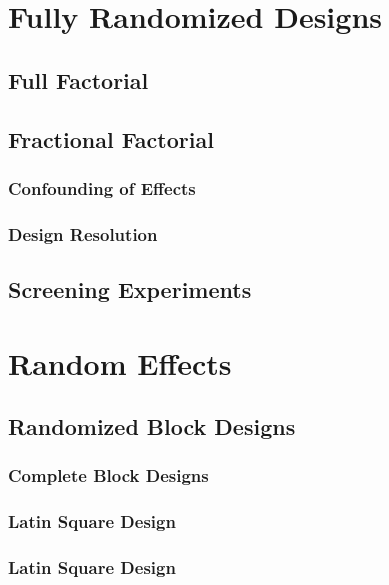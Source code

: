 \section{Fully Randomized Designs}

\subsection{Full Factorial}

\subsection{Fractional Factorial}

\subsubsection{Confounding of Effects}

\subsubsection{Design Resolution}


\subsection{Screening Experiments}

\section{Random Effects}

\subsection{Randomized Block Designs}

\subsubsection{Complete Block Designs}


\subsubsection{Latin Square Design}

\subsubsection{Latin Square Design}

